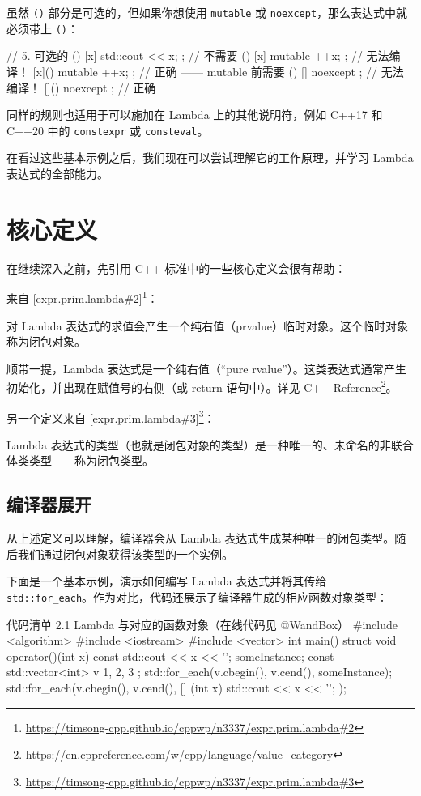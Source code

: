 虽然 \texttt{()} 部分是可选的，但如果你想使用 \texttt{mutable} 或 \texttt{noexcept}，那么表达式中就必须带上 \texttt{()}：

\begin{codebox}
// 5. 可选的 ()
[x] { std::cout << x; }; // 不需要 ()
[x] mutable { ++x; };
// 无法编译！
[x]() mutable { ++x; };
// 正确 —— mutable 前需要 ()
[] noexcept { };
// 无法编译！
[]() noexcept { };
// 正确
\end{codebox}

同样的规则也适用于可以施加在 Lambda 上的其他说明符，例如 C++17 和 C++20 中的 \texttt{constexpr} 或 \texttt{consteval}。

在看过这些基本示例之后，我们现在可以尝试理解它的工作原理，并学习 Lambda 表达式的全部能力。

\section{核心定义}

在继续深入之前，先引用 C++ 标准中的一些核心定义会很有帮助：

来自 [expr.prim.lambda\#2]\footnote{\url{https://timsong-cpp.github.io/cppwp/n3337/expr.prim.lambda\#2}}：

对 Lambda 表达式的求值会产生一个纯右值（prvalue）临时对象。这个临时对象称为闭包对象。

顺带一提，Lambda 表达式是一个纯右值（“pure rvalue”）。这类表达式通常产生初始化，并出现在赋值号的右侧（或 return 语句中）。详见 C++ Reference\footnote{\url{https://en.cppreference.com/w/cpp/language/value_category}}。

另一个定义来自 [expr.prim.lambda\#3]\footnote{\url{https://timsong-cpp.github.io/cppwp/n3337/expr.prim.lambda\#3}}：

Lambda 表达式的类型（也就是闭包对象的类型）是一种唯一的、未命名的非联合体类类型——称为闭包类型。

\subsection{编译器展开}

从上述定义可以理解，编译器会从 Lambda 表达式生成某种唯一的闭包类型。随后我们通过闭包对象获得该类型的一个实例。

下面是一个基本示例，演示如何编写 Lambda 表达式并将其传给 \texttt{std::for\_each}。作为对比，代码还展示了编译器生成的相应函数对象类型：

\begin{codeboxt}{代码清单 2.1 Lambda 与对应的函数对象（在线代码见 @WandBox）}
#include <algorithm>
#include <iostream>
#include <vector>
int main() {
struct {
void operator()(int x) const {
std::cout << x << '\n';
}
} someInstance;
const std::vector<int> v { 1, 2, 3 };
std::for_each(v.cbegin(), v.cend(), someInstance);
std::for_each(v.cbegin(), v.cend(), [] (int x) {
std::cout << x << '\n';
}
);
}
\end{codeboxt}

